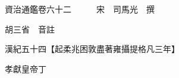 










 


 
 


 

  
  
  
  
  





  
  
  
  
  
 
  

  

  
  
  



  

 
 

  
   




  

  
  


  　　資治通鑑卷六十二　　　宋　司馬光　撰

　　胡三省　音註

　　漢紀五十四【起柔兆困敦盡著雍攝提格凡三年】

　　孝獻皇帝丁

